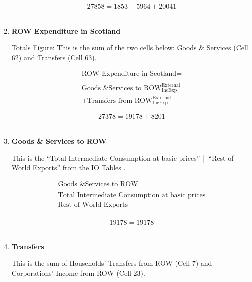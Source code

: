 \begin{enumerate}
\begin{equation} \nonumber
27858 = 1853+5964+20041
\end{equation}\\


\item \textbf {ROW Expenditure in Scotland}

Totals Figure: This is the sum of the two cells below: Goods \& Services (Cell 62) and Transfers (Cell 63).

\begin{equation}
\begin{split}
\text{ROW Expenditure in Scotland} =  \\ \\
\text{Goods \& Services to ROW}^\text{External}_\text{IncExp}\\
+\text{Transfers from ROW}^\text{External}_\text{IncExp}
\end{split} \label{eq:2.5.65}
\end{equation}

\begin{equation} \nonumber
27378 = 19178+8201
\end{equation}\\


\item \textbf {Goods \& Services to ROW}

This is the ``Total Intermediate Consumption at basic prices'' || ``Rest of World Exports'' from the IO Tables \cite{ScotGov2013a}.

\begin{equation}
\begin{split}
\text{Goods \& Services to ROW} =  \\ \\
\text{Total Intermediate Consumption at basic prices}\\\text{Rest of World Exports}\\
\end{split} \label{eq:2.5.66}
\end{equation}

\begin{equation} \nonumber
19178 = 19178
\end{equation}\\

\newpage

\item \textbf {Transfers}

This is the sum of Households' Transfers from ROW (Cell 7) and Corporations' Income from ROW (Cell 23).


\end{enumerate}
